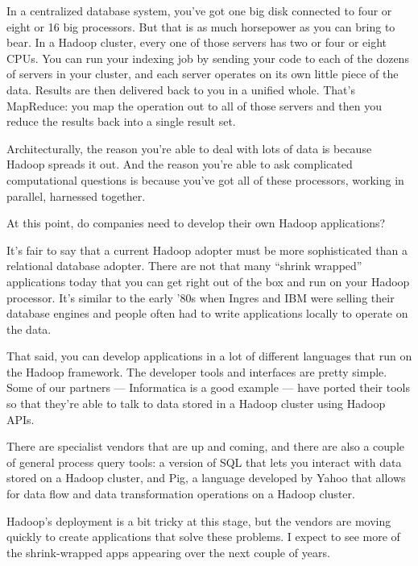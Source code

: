 \documentclass{beamer}
\begin{document}
\begin{frame}

In a centralized database system, you’ve got one big disk connected to four or eight or 16 big processors. But that is as much horsepower as you can bring to bear. In a Hadoop cluster, every one of those servers has two or four or eight CPUs. You can run your indexing job by sending your code to each of the dozens of servers in your cluster, and each server operates on its own little piece of the data. Results are then delivered back to you in a unified whole. That’s MapReduce: you map the operation out to all of those servers and then you reduce the results back into a single result set.

Architecturally, the reason you’re able to deal with lots of data is because Hadoop spreads it out. And the reason you’re able to ask complicated computational questions is because you’ve got all of these processors, working in parallel, harnessed together.

\end{frame}
\begin{frame}
At this point, do companies need to develop their own Hadoop applications?

It’s fair to say that a current Hadoop adopter must be more sophisticated than a relational database adopter. There are not that many “shrink wrapped” applications today that you can get right out of the box and run on your Hadoop processor. It’s similar to the early ’80s when Ingres and IBM were selling their database engines and people often had to write applications locally to operate on the data.
\end{frame}
\begin{frame}
That said, you can develop applications in a lot of different languages that run on the Hadoop framework. The developer tools and interfaces are pretty simple. Some of our partners — Informatica is a good example — have ported their tools so that they’re able to talk to data stored in a Hadoop cluster using Hadoop APIs. 

There are specialist vendors that are up and coming, and there are also a couple of general process query tools: a version of SQL that lets you interact with data stored on a Hadoop cluster, and Pig, a language developed by Yahoo that allows for data flow and data transformation operations on a Hadoop cluster.

Hadoop’s deployment is a bit tricky at this stage, but the vendors are moving quickly to create applications that solve these problems. I expect to see more of the shrink-wrapped apps appearing over the next couple of years.
\end{frame}
\end{document}
